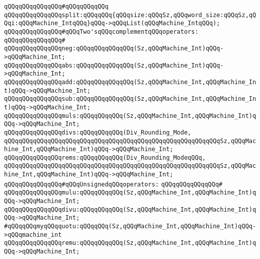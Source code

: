 \verb|qQQqqQQqqQQqqQQq#qQQqqQQqqQQq|\newline
\verb|qQQqqQQqqQQqqQQqsplit:qQQqqQQq{qQQqsize:qQQqSz,qQQqword_size:qQQqSz,qQQqi:qQQqMachine_IntqQQq}qQQq->qQQqList(qQQqMachine_IntqQQq);|\newline
\newline
\verb|qQQqqQQqqQQqqQQq#qQQqTwo'sqQQqcomplementqQQqoperators:|\newline
\verb|qQQqqQQqqQQqqQQq#|\newline
\verb|qQQqqQQqqQQqqQQqneg:qQQqqQQqqQQqqQQq(Sz,qQQqMachine_Int)qQQq->qQQqMachine_Int;|\newline
\verb|qQQqqQQqqQQqqQQqabs:qQQqqQQqqQQqqQQq(Sz,qQQqMachine_Int)qQQq->qQQqMachine_Int;|\newline
\verb|qQQqqQQqqQQqqQQqadd:qQQqqQQqqQQqqQQq(Sz,qQQqMachine_Int,qQQqMachine_Int)qQQq->qQQqMachine_Int;|\newline
\verb|qQQqqQQqqQQqqQQqsub:qQQqqQQqqQQqqQQq(Sz,qQQqMachine_Int,qQQqMachine_Int)qQQq->qQQqMachine_Int;|\newline
\verb|qQQqqQQqqQQqqQQqmuls:qQQqqQQqqQQq(Sz,qQQqMachine_Int,qQQqMachine_Int)qQQq->qQQqMachine_Int;|\newline
\verb|qQQqqQQqqQQqqQQqdivs:qQQqqQQqqQQq(Div_Rounding_Mode,|\newline
\verb|qQQqqQQqqQQqqQQqqQQqqQQqqQQqqQQqqQQqqQQqqQQqqQQqqQQqqQQqqQQqSz,qQQqMachine_Int,qQQqMachine_Int)qQQq->qQQqMachine_Int;|\newline
\verb|qQQqqQQqqQQqqQQqrems:qQQqqQQqqQQq(Div_Rounding_ModeqQQq,|\newline
\verb|qQQqqQQqqQQqqQQqqQQqqQQqqQQqqQQqqQQqqQQqqQQqqQQqqQQqqQQqqQQqSz,qQQqMachine_Int,qQQqMachine_Int)qQQq->qQQqMachine_Int;|\newline
\newline
\verb|qQQqqQQqqQQqqQQq#qQQqUnsignedqQQqoperators:|\newline
\verb|qQQqqQQqqQQqqQQq#|\newline
\verb|qQQqqQQqqQQqqQQqmulu:qQQqqQQqqQQq(Sz,qQQqMachine_Int,qQQqMachine_Int)qQQq->qQQqMachine_Int;|\newline
\verb|qQQqqQQqqQQqqQQqdivu:qQQqqQQqqQQq(Sz,qQQqMachine_Int,qQQqMachine_Int)qQQq->qQQqMachine_Int;|\newline
\newline
\verb|#qQQqqQQqmyqQQqquotu:qQQqqQQq(Sz,qQQqMachine_Int,qQQqMachine_Int)qQQq->qQQqmachine_int|\newline
\newline
\verb|qQQqqQQqqQQqqQQqremu:qQQqqQQqqQQq(Sz,qQQqMachine_Int,qQQqMachine_Int)qQQq->qQQqMachine_Int;|\newline
